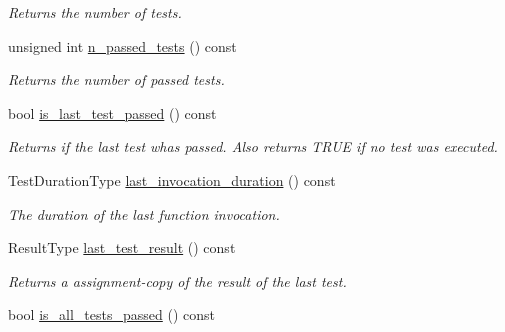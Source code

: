 \begin{DoxyCompactItemize}
\begin{DoxyCompactList}\small\item\em Returns the number of tests. \end{DoxyCompactList}\item 
unsigned int \hyperlink{classunittest_1_1_function_test_acc025a166bf4840d426e2a9f0b639297}{n\+\_\+passed\+\_\+tests} () const \hypertarget{classunittest_1_1_function_test_acc025a166bf4840d426e2a9f0b639297}{}\label{classunittest_1_1_function_test_acc025a166bf4840d426e2a9f0b639297}

\begin{DoxyCompactList}\small\item\em Returns the number of passed tests. \end{DoxyCompactList}\item 
bool \hyperlink{classunittest_1_1_function_test_a986ab165971bbf218117ef36a9b6cda0}{is\+\_\+last\+\_\+test\+\_\+passed} () const \hypertarget{classunittest_1_1_function_test_a986ab165971bbf218117ef36a9b6cda0}{}\label{classunittest_1_1_function_test_a986ab165971bbf218117ef36a9b6cda0}

\begin{DoxyCompactList}\small\item\em Returns if the last test whas passed. Also returns T\+R\+UE if no test was executed. \end{DoxyCompactList}\item 
Test\+Duration\+Type \hyperlink{classunittest_1_1_function_test_a63136c98f5f9f8189ff710112bd55a08}{last\+\_\+invocation\+\_\+duration} () const \hypertarget{classunittest_1_1_function_test_a63136c98f5f9f8189ff710112bd55a08}{}\label{classunittest_1_1_function_test_a63136c98f5f9f8189ff710112bd55a08}

\begin{DoxyCompactList}\small\item\em The duration of the last function invocation. \end{DoxyCompactList}\item 
Result\+Type \hyperlink{classunittest_1_1_function_test_acd04aafd9cb3bb7ee22876e1e3979a11}{last\+\_\+test\+\_\+result} () const \hypertarget{classunittest_1_1_function_test_acd04aafd9cb3bb7ee22876e1e3979a11}{}\label{classunittest_1_1_function_test_acd04aafd9cb3bb7ee22876e1e3979a11}

\begin{DoxyCompactList}\small\item\em Returns a assignment-\/copy of the result of the last test. \end{DoxyCompactList}\item 
bool \hyperlink{classunittest_1_1_function_test_ac54d10d4dba64b9545ae7b2d30ae3d48}{is\+\_\+all\+\_\+tests\+\_\+passed} () const \hypertarget{classunittest_1_1_function_test_ac54d10d4dba64b9545ae7b2d30ae3d48}{}\label{classunittest_1_1_function_test_ac54d10d4dba64b9545ae7b2d30ae3d48}


\end{DoxyCompactItemize}

